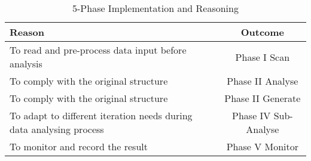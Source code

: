\begin{table}[h]
\caption{5-Phase Implementation and Reasoning}
\label{table:table4_6}
\centering
\begin{tabular}{lc}
	\toprule
	\textbf{Reason} & \textbf{Outcome} \\
	\midrule
	To read and pre-process data input before
analysis & Phase I Scan \\
	To comply with the original structure	& Phase II Analyse \\
	To comply with the original structure	& Phase II Generate \\
	To adapt to different iteration needs	during
data analysing process & Phase IV Sub-Analyse \\
	To monitor and record the result & Phase V Monitor \\
	\bottomrule
\end{tabular} 
\end{table}
